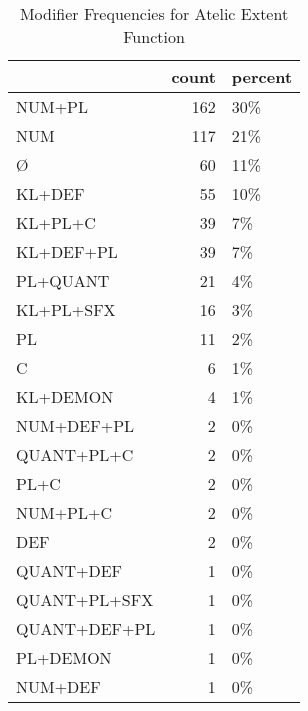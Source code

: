 \begin{table}[htbp!]
\centering
\caption{Modifier Frequencies for Atelic Extent Function}
\label{table:atelext_mod_cp}
\begin{tabular}{lrl}
\toprule
{} &  count & percent \\
\midrule
NUM+PL       &    162 &     30\% \\
NUM          &    117 &     21\% \\
Ø            &     60 &     11\% \\
KL+DEF       &     55 &     10\% \\
KL+PL+C      &     39 &      7\% \\
KL+DEF+PL    &     39 &      7\% \\
PL+QUANT     &     21 &      4\% \\
KL+PL+SFX    &     16 &      3\% \\
PL           &     11 &      2\% \\
C            &      6 &      1\% \\
KL+DEMON     &      4 &      1\% \\
NUM+DEF+PL   &      2 &      0\% \\
QUANT+PL+C   &      2 &      0\% \\
PL+C         &      2 &      0\% \\
NUM+PL+C     &      2 &      0\% \\
DEF          &      2 &      0\% \\
QUANT+DEF    &      1 &      0\% \\
QUANT+PL+SFX &      1 &      0\% \\
QUANT+DEF+PL &      1 &      0\% \\
PL+DEMON     &      1 &      0\% \\
NUM+DEF      &      1 &      0\% \\
\bottomrule
\end{tabular}
\end{table}
